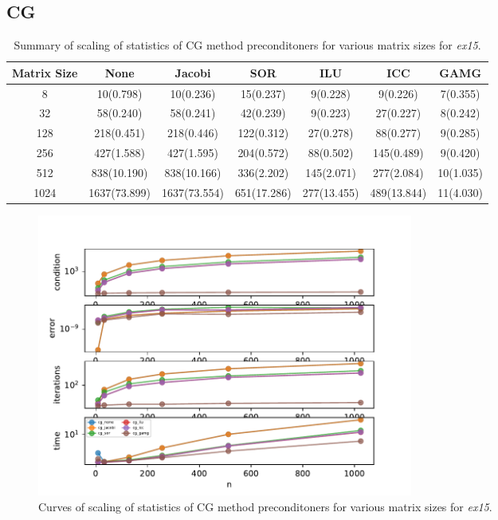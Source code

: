 \documentclass[12pt,letterpaper]{article}
\newcommand{\program}{\textit{ex15}}
\begin{document}
\subsection{CG}
\begin{table}[htb!]
    \centering
    \caption{Summary of scaling of statistics of CG method preconditoners for various matrix sizes for \program.}
    \label{tab:Ex3a_cg}
    \begin{tabular}{|c|c|c|c|c|c|c|} \hline
        Matrix Size & None & Jacobi & SOR & ILU & ICC & GAMG \\ \hline
        8   &    10(0.798)  &    10(0.236) &  15(0.237) &  9(0.228) &  9(0.226)  &  7(0.355) \\ \hline
        32  &    58(0.240)  &    58(0.241) &  42(0.239) &  9(0.223) &  27(0.227)  &  8(0.242) \\ \hline
        128 &    218(0.451)  &    218(0.446) &  122(0.312) &  27(0.278) &  88(0.277)  &  9(0.285) \\ \hline
        256 &    427(1.588)  &    427(1.595) &  204(0.572) &  88(0.502) &  145(0.489)  &  9(0.420) \\ \hline
        512 &   838(10.190)  &   838(10.166) &  336(2.202) &  145(2.071) &  277(2.084)  &  10(1.035) \\ \hline
        1024 &   1637(73.899)  &   1637(73.554) &  651(17.286) &  277(13.455) & 489(13.844) &  11(4.030) \\ \hline
    \end{tabular}
\end{table}

\begin{figure}[ht]
  \centering
  \includegraphics[width=0.6\textwidth,trim={0 0 0 0cm},clip]{results_cg.pdf}
  \caption{Curves of scaling of statistics of CG method preconditoners for various matrix sizes for \program.}
  \label{fig:Ex3a_cg}
\end{figure}
\end{document}
